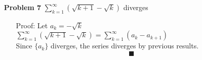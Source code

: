 \documentclass[a4paper,12pt]{report}
\begin{document}
\begin{enumerate}
\item[\bf{Problem 7}] $\sum\limits_{k=1}^{\infty}(\sqrt{k+1} - \sqrt{k})$ diverges
	\begin{enumerate}
	\item[Proof:] 
	Let $a_k = - \sqrt{k}$ \\
	$\sum\limits_{k=1}^{\infty}(\sqrt{k+1} - \sqrt{k}) = \sum\limits_{k=1}^{\infty}(a_k - a_{k+1})$ \\
	Since $\{a_k\}$ diverges, the series diverges by previous results.
	\[\blacksquare\]
	\end{enumerate}

\end{enumerate}
\end{document}
